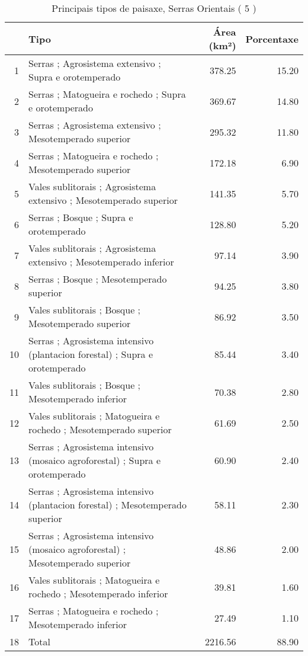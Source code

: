 \begin{table}[p]
\centering
\caption{Principais tipos de paisaxe,  Serras Orientais ( 5 )} 
\label{Tipos 5}
\begin{tabular}{rlrr}
  \hline
 & Tipo & Área (km²) & Porcentaxe \\ 
  \hline
1 & Serras ; Agrosistema extensivo ; Supra e orotemperado & 378.25 & 15.20 \\ 
  2 & Serras ; Matogueira e rochedo ; Supra e orotemperado & 369.67 & 14.80 \\ 
  3 & Serras ; Agrosistema extensivo ; Mesotemperado superior & 295.32 & 11.80 \\ 
  4 & Serras ; Matogueira e rochedo ; Mesotemperado superior & 172.18 & 6.90 \\ 
  5 & Vales sublitorais ; Agrosistema extensivo ; Mesotemperado superior & 141.35 & 5.70 \\ 
  6 & Serras ; Bosque ; Supra e orotemperado & 128.80 & 5.20 \\ 
  7 & Vales sublitorais ; Agrosistema extensivo ; Mesotemperado inferior & 97.14 & 3.90 \\ 
  8 & Serras ; Bosque ; Mesotemperado superior & 94.25 & 3.80 \\ 
  9 & Vales sublitorais ; Bosque ; Mesotemperado superior & 86.92 & 3.50 \\ 
  10 & Serras ; Agrosistema intensivo (plantacion forestal) ; Supra e orotemperado & 85.44 & 3.40 \\ 
  11 & Vales sublitorais ; Bosque ; Mesotemperado inferior & 70.38 & 2.80 \\ 
  12 & Vales sublitorais ; Matogueira e rochedo ; Mesotemperado superior & 61.69 & 2.50 \\ 
  13 & Serras ; Agrosistema intensivo (mosaico agroforestal) ; Supra e orotemperado & 60.90 & 2.40 \\ 
  14 & Serras ; Agrosistema intensivo (plantacion forestal) ; Mesotemperado superior & 58.11 & 2.30 \\ 
  15 & Serras ; Agrosistema intensivo (mosaico agroforestal) ; Mesotemperado superior & 48.86 & 2.00 \\ 
  16 & Vales sublitorais ; Matogueira e rochedo ; Mesotemperado inferior & 39.81 & 1.60 \\ 
  17 & Serras ; Matogueira e rochedo ; Mesotemperado inferior & 27.49 & 1.10 \\ 
  18 & Total & 2216.56 & 88.90 \\ 
   \hline
\end{tabular}
\end{table}
